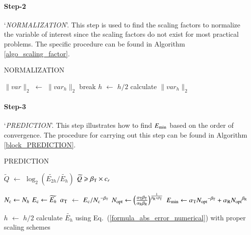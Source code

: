 \documentclass[review,3p]{elsarticle}
\begin{document}
\paragraph{Step-2} `\textit{NORMALIZATION}'. This step is used to find the scaling factors to normalize the variable of interest since the scaling factors do not exist for most practical problems. The specific procedure can be found in Algorithm \ref{algo_scaling_factor}.

\vspace{0.2cm}
\begin{algorithm}[H]
\caption{NORMALIZATION}
\label{algo_scaling_factor}
{
    {
        $\|var\|_{2}$ $\gets$ $\|var_{h}\|_{2}$\;
        break\;
    }
    {
        $h$ $\gets$ $h/2$\;
        calculate $\|var_h\|_{2}$\;    
    }
}
\end{algorithm}
                                                                   
\paragraph{Step-3} `\textit{PREDICTION}'. This step illustrates how to find $E_{\rm min}$ based on the order of convergence.
The procedure for carrying out this step can be found in Algorithm \ref{block_PREDICTION}.

\vspace{0.2cm}
\begin{algorithm}[H]
\caption{PREDICTION}			%
\label{block_PREDICTION}
    {
        $\widetilde{Q}$ $\gets$ $\log _2 \left( {\widetilde {E_{2h}}}/{\widetilde {E_{h}}} \right)$\;
        \eIf
        {
            $\widetilde{Q} \geqslant \beta_{\rm T} \times c_r$
        }
        {
            $N_{\rm c} \gets N_h$\;
            $E_{\rm c} \gets \widetilde {E_{h}}$\;
            $\alpha_{\rm T}$ $\gets$ ${E_{\rm c}}/{N_{\rm c}}^{- \beta_{\rm T}}$\;
            $N_{\rm opt} \gets \left( \frac{\alpha_{\rm T} \beta_{\rm T}}{\alpha _{\rm R} \beta_{\rm R}} \right)^{\frac{1}{\beta_{\rm R} + \beta_{\rm T}}}$\;
            $E_{\rm min} \gets \alpha_{\rm T} {N_{\rm opt}}^{- {\beta _{\rm T}}} + \alpha_{\rm R} {N_{\rm opt}}^{{\beta _{\rm R}}}$\;

        }
        {
            $h$ $\gets$ $h/2$\;
            calculate $\widetilde {E_{h}}$ using Eq.~(\ref{formula_abs_error_numerical}) with proper scaling schemes\;
        }
	}    
\end{algorithm}
\end{document}
